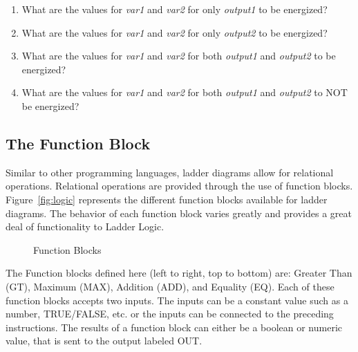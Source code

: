 \begin{enumerate}[noitemsep]
    \item What are the values for \textit{var1} and \textit{var2} for only \textit{output1} to be energized?
    \item What are the values for \textit{var1} and \textit{var2} for only \textit{output2} to be energized?
    \item What are the values for \textit{var1} and \textit{var2} for both \textit{output1} and \textit{output2} to be energized?
    \item What are the values for \textit{var1} and \textit{var2} for both \textit{output1} and \textit{output2} to NOT be energized?    
\end{enumerate}


\subsection{The Function Block}
Similar to other programming languages, ladder diagrams allow for relational operations.  Relational operations are provided through the use of function blocks. Figure~\ref{fig:logic} represents the different function blocks available for ladder diagrams. The behavior of each function block varies greatly and provides a great deal of functionality to Ladder Logic.

\begin{figure}[!htb]
\begin{center}
\end{center}
\caption[skip=-6pt]{Function Blocks}
\label{fig:functionBlock}
\end{figure}

The Function blocks defined here (left to right, top to bottom) are: Greater Than (GT), Maximum (MAX), Addition (ADD), and Equality (EQ). Each of these function blocks accepts two inputs. The inputs can be a constant value such as a number, TRUE/FALSE, etc. or the inputs can be connected to the preceding instructions. The results of a function block can either be a boolean or numeric value, that is sent to the output labeled OUT.

